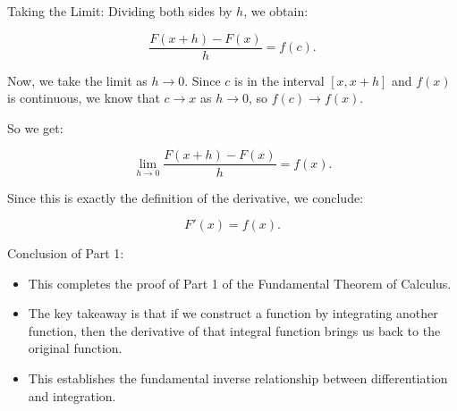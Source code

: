 \documentclass{beamer}
\begin{document}
\begin{frame}{Taking the Limit:}
    \footnotesize
    Dividing both sides by \( h \), we obtain:

    \[
    \frac{F(x+h) - F(x)}{h} = f(c).
    \]

    Now, we take the limit as \( h \to 0 \). Since \( c \) is in the interval \( [x, x+h] \) and \( f(x) \) is continuous, we know that \( c \to x \) as \( h \to 0 \), so \( f(c) \to f(x) \).

    So we get:

    \[
    \lim\limits_{h \to 0} \frac{F(x+h) - F(x)}{h} = f(x).
    \]

    Since this is exactly the definition of the derivative, we conclude:

    \[
    F'(x) = f(x).
    \]
\end{frame}
\newpage

\begin{frame}{Conclusion of Part 1:}
    \begin{itemize}
        \item This completes the proof of Part 1 of the Fundamental Theorem of Calculus.
        \item The key takeaway is that if we construct a function by integrating another function, then the derivative of that integral function brings us back to the original function.
        \item This establishes the fundamental inverse relationship between differentiation and integration.
    \end{itemize}
\end{frame}

\newpage
\end{document}
